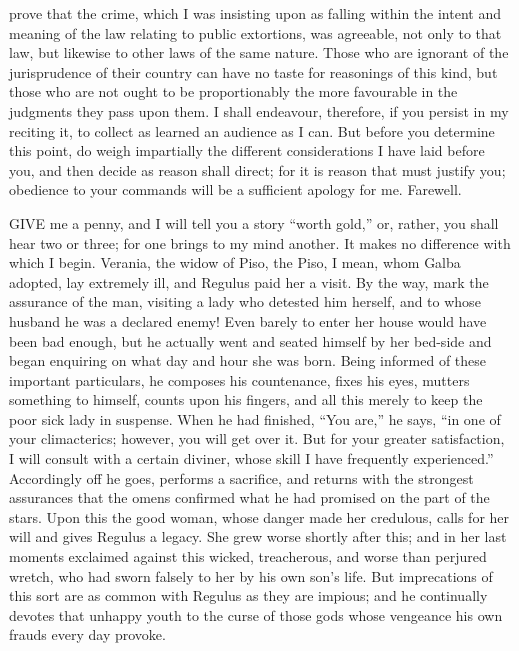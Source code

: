 prove that the crime, which I was insisting upon as falling within the
intent and meaning of the law relating to public extortions, was
agreeable, not only to that law, but likewise to other laws of the same
nature. Those who are ignorant of the jurisprudence of their country can
have no taste for reasonings of this kind, but those who are not ought to
be proportionably the more favourable in the judgments they pass upon
them. I shall endeavour, therefore, if you persist in my reciting it, to
collect as learned an audience as I can. But before you determine this
point, do weigh impartially the different considerations I have laid
before you, and then decide as reason shall direct; for it is reason that
must justify you; obedience to your commands will be a sufficient apology
for me. Farewell.


GIVE me a penny, and I will tell you a story ``worth gold,'' or, rather, you
shall hear two or three; for one brings to my mind another. It makes no
difference with which I begin. Verania, the widow of Piso, the Piso, I
mean, whom Galba adopted, lay extremely ill, and Regulus paid her a visit.
By the way, mark the assurance of the man, visiting a lady who detested
him herself, and to whose husband he was a declared enemy! Even barely to
enter her house would have been bad enough, but he actually went and
seated himself by her bed-side and began enquiring on what day and hour
she was born. Being informed of these important particulars, he composes
his countenance, fixes his eyes, mutters something to himself, counts upon
his fingers, and all this merely to keep the poor sick lady in suspense.
When he had finished, ``You are,'' he says, ``in one of your climacterics;
however, you will get over it. But for your greater satisfaction, I will
consult with a certain diviner, whose skill I have frequently
experienced.'' Accordingly off he goes, performs a sacrifice, and returns
with the strongest assurances that the omens confirmed what he had
promised on the part of the stars. Upon this the good woman, whose danger
made her credulous, calls for her will and gives Regulus a legacy. She
grew worse shortly after this; and in her last moments exclaimed against
this wicked, treacherous, and worse than perjured wretch, who had sworn
falsely to her by his own son's life. But imprecations of this sort are as
common with Regulus as they are impious; and he continually devotes that
unhappy youth to the curse of those gods whose vengeance his own frauds
every day provoke.

